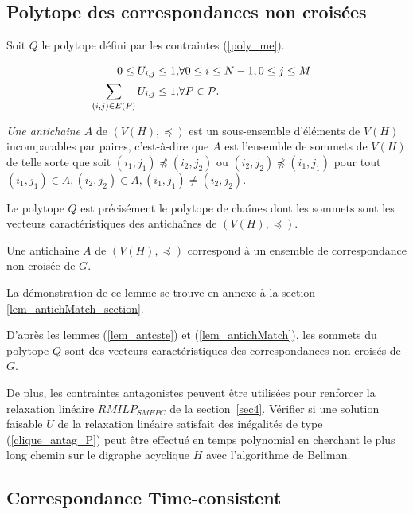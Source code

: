 {{\subsection{Polytope des correspondances non croisées}\label{NonCross}
Soit $Q$ le polytope défini par les contraintes (\ref{poly_me}).

\begin{subequations}\label{poly_me}
	\begin{align}
0 \leq U_{i,j} \leq 1,& \forall 0 \leq i \leq N-1, 0 \leq j \leq M &\label{positivite}\\
\sum_{(i, j) \in E(P)} U_{i,j} \leq 1,& \forall  P \in {\cal P}. &\label{antichaine}
\end{align}
\end{subequations}


{\it Une antichaine} $A$ de $(V(H),\preceq)$ est un sous-ensemble d'éléments de $V(H)$ incomparables par paires, c'est-à-dire que $A$ est l'ensemble de sommets de $V(H)$ de telle sorte que soit $(i_1,j_1)\npreceq (i_2,j_2)$ ou $(i_2,j_2)\npreceq (i_1,j_1)$ pour tout $(i_1,j_1)\in A, (i_2,j_2) \in A,(i_1,j_1)\neq (i_2,j_2)$.

Le polytope $Q$ est précisément le polytope de chaînes dont les sommets sont les vecteurs caractéristiques des antichaînes de $(V(H),\preceq)$.

\begin{Lem}\label{lem_antichMatch}
	Une antichaine $A$ de $(V(H),\preceq)$ correspond à un ensemble de correspondance non croisée de $G$.
\end{Lem}
La démonstration de ce lemme se trouve en annexe à la section \ref{lem_antichMatch_section}.

D'après les lemmes (\ref{lem_antcste}) et (\ref{lem_antichMatch}), les sommets du polytope $Q$ sont des vecteurs caractéristiques des correspondances non croisés de $G$.

De plus, les contraintes antagonistes peuvent être utilisées pour renforcer la relaxation linéaire $RMILP_{SMEPC}$ de la section~\ref{sec4}.
Vérifier si une solution faisable $U$ de la relaxation linéaire satisfait des inégalités de type (\ref{clique_antag_P}) peut être effectué en temps polynomial
en cherchant le plus long chemin sur le digraphe acyclique $H$ avec l'algorithme de Bellman.

\subsection{Correspondance Time-consistent}

}}
